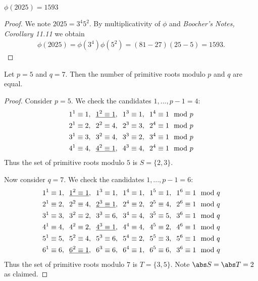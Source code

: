 \documentclass{article}
\begin{document}
\begin{claim*}[2]
	$\phi(2025)=1593$
	\begin{proof}
		We note $2025 = 3^4 5^2$.
		By multiplicativity of $\phi$ and \emph{Boocher's Notes, Corollary 11.11}
		we obtain
		\begin{align*}
			\phi(2025) = \phi(3^4)\phi(5^2) = (81-27)(25-5) = 1593.
		\end{align*}
	\end{proof}
\end{claim*}

\renewcommand{\hs}{\hspace{0.2cm}}
\begin{claim*}[3]
	Let $p=5$ and $q=7$. Then the number of primitive roots modulo $p$ and $q$ are equal.
	\begin{proof}
		Consider $p=5$. We check the candidates $1,...,p-1=4$:
		\begin{align*}
			1^1 \equiv 1,\hs \underline{1^2 \equiv 1},\hs 1^3 \equiv 1,\hs 1^4 \equiv 1 \mod p \\
			2^1 \equiv 2,\hs 2^2 \equiv 4,            \hs 2^3 \equiv 3,\hs 2^4 \equiv 1 \mod p \\
			3^1 \equiv 3,\hs 3^2 \equiv 4,            \hs 3^3 \equiv 2,\hs 3^4 \equiv 1 \mod p \\
			4^1 \equiv 4,\hs \underline{4^2 \equiv 1},\hs 4^3 \equiv 4,\hs 2^4 \equiv 1 \mod p
		\end{align*}
		Thus the set of primitive roots modulo $5$ is $S=\{2,3\}$.

		Now consider $q=7$. We check the candidates $1,...,p-1=6$:
		\begin{align*}
			1^1 \equiv 1,\hs \underline{1^2 \equiv 1},\hs 1^3 \equiv 1,             \hs 1^4 \equiv 1,\hs 1^5 \equiv 1,\hs 1^6 \equiv 1 \mod q \\
			2^1 \equiv 2,\hs 2^2 \equiv 4,            \hs \underline{2^3 \equiv 1}, \hs 2^4 \equiv 2,\hs 2^5 \equiv 4,\hs 2^6 \equiv 1 \mod q \\
			3^1 \equiv 3,\hs 3^2 \equiv 2,            \hs 3^3 \equiv 6,             \hs 3^4 \equiv 4,\hs 3^5 \equiv 5,\hs 3^6 \equiv 1 \mod q \\
			4^1 \equiv 4,\hs 4^2 \equiv 2,            \hs \underline{4^3 \equiv 1}, \hs 4^4 \equiv 4,\hs 4^5 \equiv 2,\hs 4^6 \equiv 1 \mod q \\
			5^1 \equiv 5,\hs 5^2 \equiv 4,            \hs 5^3 \equiv 6,             \hs 5^4 \equiv 2,\hs 5^5 \equiv 3,\hs 5^6 \equiv 1 \mod q \\
			6^1 \equiv 6,\hs \underline{6^2 \equiv 1},\hs 6^3 \equiv 6,             \hs 6^4 \equiv 1,\hs 6^5 \equiv 6,\hs 3^6 \equiv 1 \mod q
		\end{align*}
		Thus the set of primitive roots modulo $7$ is $T=\{3, 5\}$.
		Note $\abs S = \abs T = 2$ as claimed.
	\end{proof}
\end{claim*}
\end{document}
